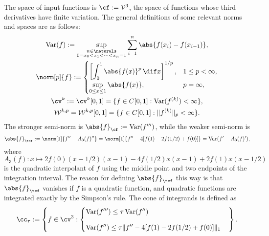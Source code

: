 \documentclass[]{elsarticle}
\DeclareMathOperator{\Var}{Var}
\theoremstyle{definition}
\theoremstyle{remark}
\newcommand{\Fnorm}[1]{\abs{#1}_{\cf}}
\newcommand{\Ftnorm}[1]{\abs{#1}_{\tcf}}
\begin{document}
The space of input functions is $\cf:=\mathcal{V}^{3}$, the space of functions whose third derivatives have finite variation.  The general definitions of some relevant norms and spaces are as follows:
\begin{subequations} \label{defSobolev}
\begin{gather}
\Var(f) := \sup_{\substack{n \in \naturals\\ 0 = x_0 < x_1 < \cdots < x_{n} =1}} \sum_{i=1}^n \abs{f(x_i)-f(x_{i-1})}, \\
\norm[p]{f}:= \begin{cases} \displaystyle \left[\int_0^1 \abs{f(x)}^p \, \dif x \right]^{1/p}, & 1 \le p < \infty,\\[1ex]
\displaystyle  \sup_{0 \le x \le 1} \abs{f(x)}, & p=\infty,
\end{cases}
\\
\cv^{k}: =\cv^{k}[0,1]=\{f\in C[0,1]: \Var(f^{(k)}) < \infty \}, \\
\mathcal{W}^{k,p}=\mathcal{W}^{k,p}[0,1]=\{f\in C[0,1]: \|f^{(k)}\|_{p}<\infty\}.
\end{gather}
\end{subequations}
The stronger semi-norm is $\Fnorm{f}:=\Var(f''')$, while the weaker semi-norm is
\[
\Ftnorm{f}:=\norm[1]{f''-A_3(f)''}=\norm[1]{f''-4[f(1)-2f(1/2)+f(0)]}=\Var(f'-A_3(f)'),
\]
where $A_3(f): x \mapsto 2f(0)(x-1/2)(x-1)-4f(1/2)x(x-1)+2f(1)x(x-1/2)$ is the quadratic interpolant of $f$ using the middle point and two endpoints of the integration interval. The reason for defining $\Ftnorm{f}$ this way is that $\Ftnorm{f}$ vanishes if $f$ is a quadratic function, and quadratic functions are integrated exactly by the Simpson's rule.  The cone of integrands is defined as
\begin{equation}\label{coneinteg}
\cc_{\tau}:=\left\{f\in \cv^{3}:\begin{cases}
\displaystyle \Var(f''')\leq\tau\Var(f'')\\[2ex]
\displaystyle \Var(f'')\leq\tau\|f''-4[f(1)-2f(1/2)+f(0)]\|_1
\end{cases}\right\}.
\end{equation}
\end{document}
